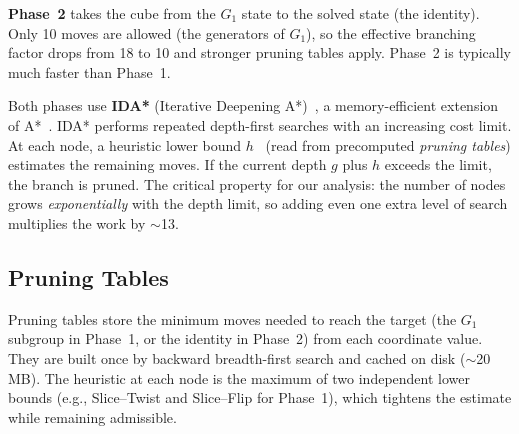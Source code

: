 \documentclass[graybox]{svmult}
\begin{document}
\textbf{Phase~2} takes the cube from the $G_1$ state to the solved state (the identity). Only 10 moves are allowed (the generators of $G_1$), so the effective branching factor drops from 18 to 10 and stronger pruning tables apply. Phase~2 is typically much faster than Phase~1.

Both phases use \textbf{IDA*} (Iterative Deepening A*)~\cite{korf1985}, a memory-efficient extension of A*~\cite{hart1968}. IDA* performs repeated depth-first searches with an increasing cost limit. At each node, a heuristic lower bound $h$~\cite{pearl1984} (read from precomputed \emph{pruning tables}) estimates the remaining moves. If the current depth $g$ plus $h$ exceeds the limit, the branch is pruned. The critical property for our analysis: the number of nodes grows \emph{exponentially} with the depth limit, so adding even one extra level of search multiplies the work by $\sim$13.

\subsection{Pruning Tables}
\label{sec:pruning}
Pruning tables store the minimum moves needed to reach the target (the $G_1$ subgroup in Phase~1, or the identity in Phase~2) from each coordinate value. They are built once by backward breadth-first search and cached on disk ($\sim$20\,MB). The heuristic at each node is the maximum of two independent lower bounds (e.g., Slice--Twist and Slice--Flip for Phase~1), which tightens the estimate while remaining admissible.
\end{document}
